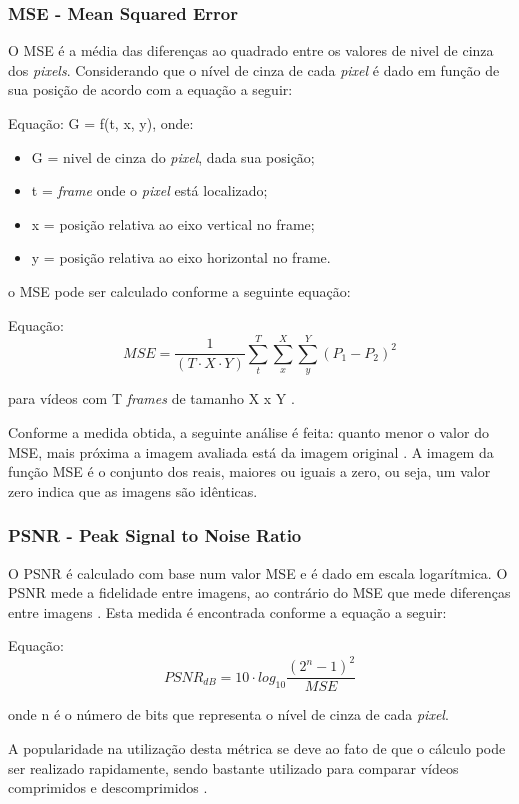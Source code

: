 \subsubsection[MSE]{MSE - Mean Squared Error}

O MSE é a média das diferenças ao quadrado entre os valores de nivel de cinza dos \emph{pixels}. Considerando que o nível de cinza de cada \emph{pixel} é dado em função de sua posição de acordo com a equação a seguir:

Equação: G = f(t, x, y), onde:

\begin{itemize}
	\item G = nivel de cinza do \emph{pixel}, dada sua posição;
	\item t = \emph{frame} onde o \emph{pixel} está localizado;
	\item x = posição relativa ao eixo vertical no frame;
	\item y = posição relativa ao eixo horizontal no frame.
\end{itemize}

o MSE pode ser calculado conforme a seguinte equação:

    Equação: \[MSE = \frac{1}{\left (T \cdot X \cdot Y \right )} \sum_{t}^{T} \sum_{x}^{X} \sum_{y}^{Y} \left ( P_{1} - P_{2} \right )^{2}\]

para vídeos com T \emph{frames} de tamanho X x Y \cite{winkler2005}.

    Conforme a medida obtida, a seguinte análise é feita: quanto menor o valor do MSE, mais próxima a imagem avaliada está da imagem original \cite{albini}. A imagem da função MSE é o conjunto dos reais, maiores ou iguais a zero, ou seja, um valor zero indica que as imagens são idênticas.

\subsubsection[PSNR]{PSNR - Peak Signal to Noise Ratio}
O PSNR é calculado com base num valor MSE e é dado em escala logarítmica. O PSNR mede a fidelidade entre imagens, ao contrário do MSE que mede diferenças entre imagens \cite{winkler2005}. Esta medida é encontrada conforme a equação a seguir:

Equação: \[PSNR_{dB} = 10 \cdot log_{10} \frac{{\left(2^{n} -1 \right )}^{2}}{MSE}\]

onde n é o número de bits que representa o nível de cinza de cada \emph{pixel}.

A popularidade na utilização desta métrica se deve ao fato de que o cálculo pode ser realizado rapidamente, sendo bastante utilizado para comparar vídeos comprimidos e descomprimidos \cite{emmersonsilva, richardson2003}.

